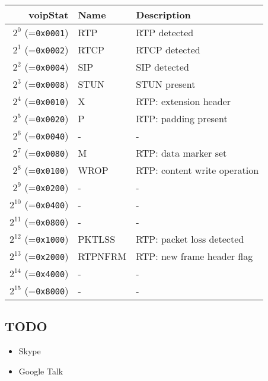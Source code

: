 \documentclass[documentation]{subfiles}
\begin{document}
\begin{longtable}{rll}
    \toprule
    {\bf voipStat} & {\bf Name} & {\bf Description}\\
    \midrule\endhead%
    $2^{0}$  (={\tt 0x0001}) & RTP     & RTP detected \\
    $2^{1}$  (={\tt 0x0002}) & RTCP    & RTCP detected \\
    $2^{2}$  (={\tt 0x0004}) & SIP     & SIP detected \\
    $2^{3}$  (={\tt 0x0008}) & STUN    & STUN present \\
    $2^{4}$  (={\tt 0x0010}) & X       & RTP: extension header  \\
    $2^{5}$  (={\tt 0x0020}) & P       & RTP: padding present \\
    $2^{6}$  (={\tt 0x0040}) & -       & -\\
    $2^{7}$  (={\tt 0x0080}) & M       & RTP: data marker set\\
    $2^{8}$  (={\tt 0x0100}) & WROP    & RTP: content write operation \\
    $2^{9}$  (={\tt 0x0200}) & -       & -\\
    $2^{10}$ (={\tt 0x0400}) & -       & -\\
    $2^{11}$ (={\tt 0x0800}) & -       & -\\
    $2^{12}$ (={\tt 0x1000}) & PKTLSS  & RTP: packet loss detected \\
    $2^{13}$ (={\tt 0x2000}) & RTPNFRM & RTP: new frame header flag \\
    $2^{14}$ (={\tt 0x4000}) & -       & -\\
    $2^{15}$ (={\tt 0x8000}) & -       & -\\
    \bottomrule
\end{longtable}

\subsection{TODO}

\begin{itemize}
    \item Skype
    \item Google Talk
\end{itemize}
\end{document}
